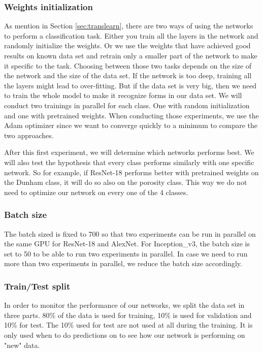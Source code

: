 \subsubsection{Weights initialization} \label{sec:init}
As mention in Section \ref{sec:translearn}, there are two ways of using the networks to perform a classification task. Either you train all the layers in the network and randomly initialize the weights. Or we use the weights that have achieved good results on known data set and retrain only a smaller part of the network to make it specific to the task.
Choosing between those two tasks depends on the size of the network and the size of the data set. If the network is too deep, training all the layers might lead to \gls{over-fitting}. But if the data set is very big, then we need to train the whole model to make it recognize forms in our data set. 
We will conduct two trainings in parallel for each class. One with random initialization and one with pretrained weights. 
When conducting those experiments, we use the Adam optimizer since we want to converge quickly to a minimum to compare the two approaches. 

After this first experiment, we will determine which networks performs best. We will also test the hypothesis that every class performs similarly with one specific network. So for example, if ResNet-18 performs better with pretrained weights on the Dunham class, it will do so also on the porosity class. This way we do not need to optimize our network on every one of the 4 classes. 

\subsubsection{Batch size}
The batch sized is fixed to 700 so that two experiments can be run in parallel on the same GPU for ResNet-18 and AlexNet. For Inception\_v3, the batch size is set to 50 to be able to run two experiments in parallel. In case we need to run more than two experiments in parallel, we reduce the batch size accordingly.

\subsubsection{Train/Test split}
In order to monitor the performance of our networks, we split the data set in three parts. 80\% of the data is used for training, 10\% is used for validation and 10\% for test. The 10\% used for test are not used at all during the training. It is only used when to do predictions on to see how our network is performing on "new" data. 

